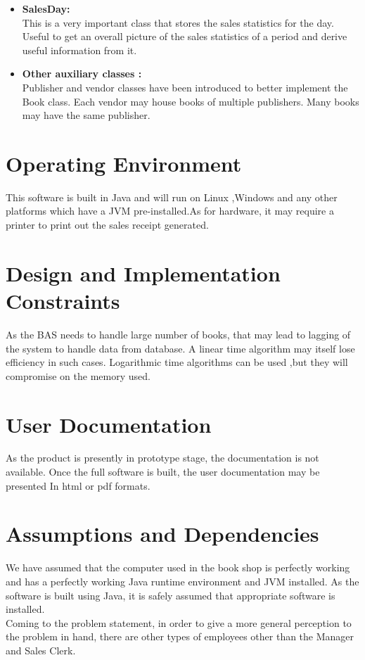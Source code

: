 \documentclass{scrreprt}
\begin{document}
\begin{itemize}
\item \textbf{SalesDay:}\\This is a very important class that stores the sales statistics for the day. Useful to get an overall picture of the sales statistics of a period and derive useful information from it.
\item \textbf{Other auxiliary classes :} \\Publisher and vendor classes have been introduced to better implement the Book class. Each vendor may house books of multiple publishers. Many books may have the same publisher.

\end{itemize}

\section{Operating Environment}
This software is built in Java and will run on Linux ,Windows and any other platforms which have a JVM pre-installed.As for hardware, it may require a printer to print out the sales receipt generated.

\section{Design and Implementation Constraints}
As the BAS needs to handle large number of books, that may lead to lagging of the system to handle data from database. 
A linear time algorithm may itself lose efficiency in such cases. Logarithmic time algorithms can be used ,but they will compromise on the memory used.

\section{User Documentation}
As the product is presently in prototype stage, the documentation is not available. Once the full software is built, the user documentation may be presented In html or pdf formats.

\section{Assumptions and Dependencies}

We have assumed that the computer used in the book shop is perfectly working and has a perfectly working Java runtime environment and JVM installed. As the software is built using Java, it is safely assumed that appropriate software is installed.\\
Coming to the problem statement, in order to give a more general perception to the problem in hand, there are other types of employees other than the Manager and Sales Clerk. 
\end{document}

